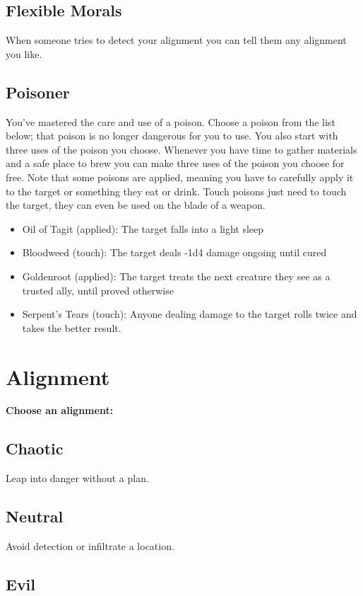 \subsection{Flexible Morals}


 When someone tries to detect your alignment you can tell them any alignment you like.
\subsection{Poisoner}


 You've mastered the care and use of a poison. Choose a poison from the list below; that poison is no longer dangerous for you to use. You also start with three uses of the poison you choose. Whenever you have time to gather materials and a safe place to brew you can make three uses of the poison you choose for free. Note that some poisons are applied, meaning you have to carefully apply it to the target or something they eat or drink. Touch poisons just need to touch the target, they can even be used on the blade of a weapon.
\begin{itemize}
\item Oil of Tagit (applied): The target falls into a light sleep
\item Bloodweed (touch): The target deals -1d4 damage ongoing until cured
\item Goldenroot (applied): The target treats the next creature they see as a trusted ally, until proved otherwise
\item Serpent's Tears (touch): Anyone dealing damage to the target rolls twice and takes the better result.

\end{itemize}
\section*{Alignment}


{\bfseries Choose an alignment:}
\subsection{Chaotic}


 Leap into danger without a plan.
\subsection{Neutral}


 Avoid detection or infiltrate a location.
\subsection{Evil}


